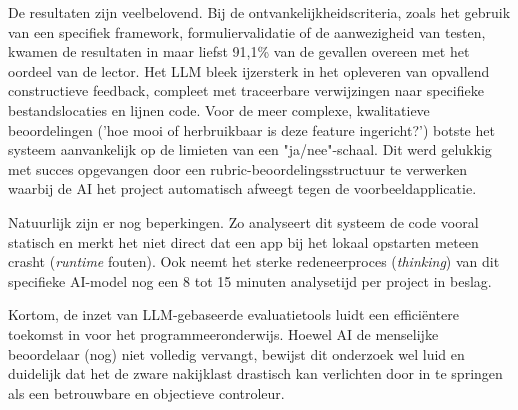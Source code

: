 \vspace{1em}

De resultaten zijn veelbelovend. Bij de ontvankelijkheidscriteria, zoals het gebruik van een specifiek framework, formuliervalidatie of de aanwezigheid van testen, kwamen de resultaten in maar liefst 91,1\% van de gevallen overeen met het oordeel van de lector. Het LLM bleek ijzersterk in het opleveren van opvallend constructieve feedback, compleet met traceerbare verwijzingen naar specifieke bestandslocaties en lijnen code. Voor de meer complexe, kwalitatieve beoordelingen ('hoe mooi of herbruikbaar is deze feature ingericht?') botste het systeem aanvankelijk op de limieten van een "ja/nee"-schaal. Dit werd gelukkig met succes opgevangen door een rubric-beoordelingsstructuur te verwerken waarbij de AI het project automatisch afweegt tegen de voorbeeldapplicatie. 

\vspace{1em}

Natuurlijk zijn er nog beperkingen. Zo analyseert dit systeem de code vooral statisch en merkt het niet direct dat een app bij het lokaal opstarten meteen crasht (\textit{runtime} fouten). Ook neemt het sterke redeneerproces (\textit{thinking}) van dit specifieke AI-model nog een 8 tot 15 minuten analysetijd per project in beslag.

\vspace{1em}

Kortom, de inzet van LLM-gebaseerde evaluatietools luidt een efficiëntere toekomst in voor het programmeeronderwijs. Hoewel AI de menselijke beoordelaar (nog) niet volledig vervangt, bewijst dit onderzoek wel luid en duidelijk dat het de zware nakijklast drastisch kan verlichten door in te springen als een betrouwbare en objectieve controleur.
